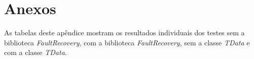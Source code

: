 
\chapter{Anexos} \label{App:ApendiceA}

As tabelas deste apêndice mostram os resultados individuais dos testes sem a biblioteca \textit{FaultRecovery}, com a biblioteca \textit{FaultRecovery}, sem a classe \textit{TData} e com a classe \textit{TData}.


